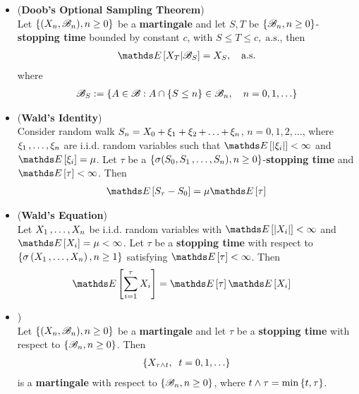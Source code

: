 \documentclass[11pt]{article}
\begin{document}
\begin{itemize}
\item \begin{theorem}(\textbf{Doob's Optional Sampling Theorem}) \citep{billingsley2008probability, resnick2013probability}\\
Let $\left\{(X_n, {\mathscr B}_n), n \ge 0\right\}$ be a \textbf{martingale} and let $S, T$ be $\left\{{\mathscr B}_n, n \ge 0\right\}$-\textbf{stopping time} bounded by constant $c$, with 
$S \le T \le c, \;\text{a.s.}$, then 
\begin{align}
\E{}{X_T | \srB_{S}} = X_S, \quad \text{a.s.} \label{eqn: optional_sampling_theorem}
\end{align} where 
\begin{align*}
{\mathscr B}_{S} := \left\{A \in {\mathscr B}: A\cap \left\{S \le n\right\} \in {\mathscr B}_{n}, \quad n=0,1,\ldots \right\}
\end{align*}
\end{theorem}



\item \begin{theorem}(\textbf{Wald's Identity}) \citep{billingsley2008probability, resnick2013probability}\\
Consider random walk $S_n = X_0 + \xi_1 + \xi_2 \,{+}\ldots{+}\, \xi_n$, $n = 0,1,2,\ldots$, where $\xi_1 \,{,}\ldots{,}\, \xi_n$ are i.i.d. random variables such that $\E{}{\abs{\xi_i}} < \infty$ and $\E{}{\xi_i} = \mu$. Let $\tau$ be a $\left\{\sigma(S_0, S_1 \,{,}\ldots{,}\, S_n), n\ge 0\right\}$-\textbf{stopping time} and $\E{}{\tau} < \infty$. Then 
\begin{align*}
\E{}{S_{\tau} - S_0} = \mu \E{}{\tau}
\end{align*}
\end{theorem}

\item \begin{proposition}(\textbf{Wald's Equation}) \citep{billingsley2008probability}\\
Let $X_1 \,{,}\ldots{,}\, X_n$ be i.i.d. random variables with $\E{}{\abs{X_i}} < \infty$ and $\E{}{X_i} = \mu <\infty$. Let $\tau$ be a \textbf{stopping time} with respect to $\left\{\sigma\left(X_1 \,{,}\ldots{,}\, X_n\right), n \ge 1\right\}$ satisfying $\E{}{\tau} < \infty$. Then
\begin{align}
\E{}{\sum_{i=1}^{\tau}X_i} &=\E{}{\tau} \E{}{X_i} \label{eqn: wald_equation}
\end{align}
\end{proposition}

\item \begin{proposition}) \citep{resnick2013probability}\\
Let $\left\{(X_n, {\mathscr B}_n), n \ge 0\right\}$ be a \textbf{martingale} and let $\tau$ be a \textbf{stopping time} with respect to $\left\{{\mathscr B}_n, n \ge 0\right\}$. Then 
\begin{align*}
\left\{X_{\tau \land t}, \;\; t=0, 1, \ldots\right\}
\end{align*} is a \textbf{martingale} with respect to $\left\{{\mathscr B}_n, n \ge 0\right\}$, where $t\land \tau = \min\left\{t, \tau\right\}$.
\end{proposition}
\end{itemize}
\end{document}
